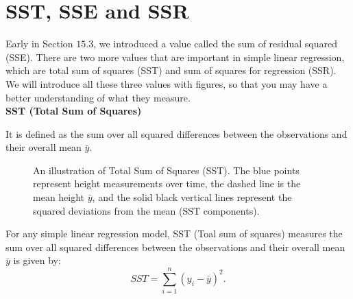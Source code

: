 \section{SST, SSE and SSR}

Early in Section $15.3$, we introduced a value called the sum of residual squared (SSE). There are two more values that are important in simple linear regression, which are total sum of squares (SST) and sum of squares for regression (SSR). We will introduce all these three values with figures, so that you may have a better understanding of what they measure.\\

\textbf{SST (Total Sum of Squares)}

It is defined as the sum over all squared differences between the observations and their overall mean $\bar{y}$.

\begin{figure}[h]
\centering
{}
\caption{An illustration of Total Sum of Squares (SST). The blue points represent height measurements over time, the dashed line is the mean height $\bar{y}$, and the solid black vertical lines represent the squared deviations from the mean (SST components).}
\end{figure}

\begin{definition}
For any simple linear regression model, SST (Toal sum of squares) measures the sum over all squared differences between the observations and their overall mean $\bar{y}$ is given by: \[ SST = \sum_{i=1}^{n}(y_i - \bar{y})^2.\]
\end{definition}

